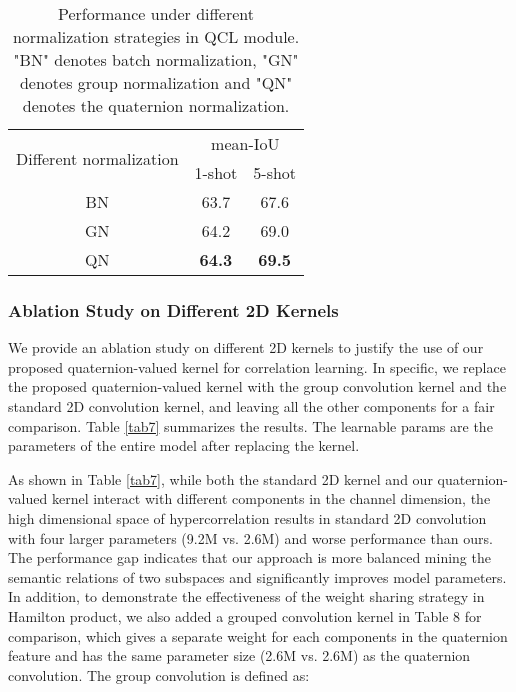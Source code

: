 \documentclass[lettersize,journal]{IEEEtran}
\begin{document}
\begin{table}
\centering
\caption{Performance under different normalization strategies in QCL module. "BN" denotes batch normalization, "GN" denotes group normalization and "QN" denotes the quaternion normalization.}
\label{tab8}
\begin{tabular}{c|cc} 
\hline
\multicolumn{1}{l|}{\multirow{2}{*}{Different normalization}} & \multicolumn{2}{c}{mean-IoU}   \\ 
\cline{2-3}
\multicolumn{1}{l|}{}                                         & 1-shot        & 5-shot         \\ 
\hline
BN                                                            & 63.7          & 67.6           \\
GN                                                            & 64.2          & 69.0           \\
QN                                                            & \textbf{64.3} & \textbf{69.5}  \\
\hline
\end{tabular}
\end{table}

\subsubsection{Ablation Study on Different 2D Kernels}
We provide an ablation study on different 2D kernels to justify the use of our proposed quaternion-valued kernel for correlation learning. In specific,  we replace the proposed quaternion-valued kernel with the group convolution kernel and the standard 2D convolution kernel, and leaving all the other components for a fair comparison. Table \ref{tab7} summarizes the results. The learnable params are the parameters of the entire model after replacing the kernel. 

As shown in Table \ref{tab7}, while both the standard 2D kernel and our quaternion-valued kernel interact with different components in the channel dimension, the high dimensional space of hypercorrelation results in standard 2D convolution with four larger parameters (9.2M vs. 2.6M) and worse performance than ours. The performance gap indicates that our approach is more balanced mining the semantic relations of two subspaces and significantly improves model parameters. In addition, to demonstrate the effectiveness of the weight sharing strategy in Hamilton product, we also added a grouped convolution kernel in Table 8 for comparison, which gives a separate weight for each components in the quaternion feature and has the same parameter size (2.6M vs. 2.6M) as the quaternion convolution. The group convolution is defined as:
\end{document}
